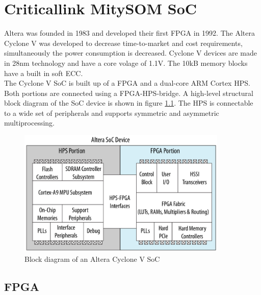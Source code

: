 \chapter{Criticallink MitySOM SoC}
Altera was founded in 1983 and developed their first FPGA in 1992.\cite{althist16} The Altera Cyclone V was developed to decrease time-to-market and cost requirements, simultaneously the power consumption is decreased. Cyclone V devices are made in 28nm technology and have a core volage of 1.1V. The 10kB memory blocks have a built in soft ECC.\cite{altcycvov15}\\
The Cyclone V SoC is built up of a FPGA and a dual-core ARM Cortex HPS. Both portions are connected using a FPGA-HPS-bridge. A high-level structural block diagram of the SoC device is shown in figure \ref{fig:alterasocblocks}. The HPS is connectable to a wide set of peripherals and supports symmetric and asymmetric multiprocessing.
\begin{figure}[htbp]
\begin{center}
\includegraphics[width=10cm,keepaspectratio=true]{bilder/png/AlteraSoC}
\caption{Block diagram of an Altera Cyclone V SoC\cite[chapter 1]{AlteraHPS15}}
\label{fig:alterasocblocks}
\end{center}
\end{figure}
\section{FPGA}
